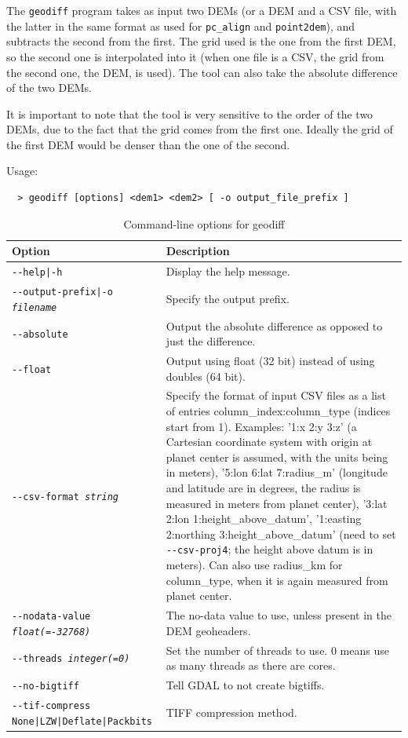 The \texttt{geodiff} program takes as input two DEMs (or a DEM and a CSV file, with the latter in the same format as used for \texttt{pc\_align} and \texttt{point2dem}), and subtracts the second from the first. The grid used is the one from the first DEM, so the second one is interpolated into it (when one file is a CSV, the grid from the second one, the DEM, is used). The tool can also take the absolute difference of the two DEMs.

It is important to note that the tool is very sensitive to the order of
the two DEMs, due to the fact that the grid comes from the first
one. Ideally the grid of the first DEM would be denser than the one of
the second.

\medskip

Usage:
\begin{verbatim}
  > geodiff [options] <dem1> <dem2> [ -o output_file_prefix ]
\end{verbatim}

\begin{longtable}{|l|p{7.5cm}|}
\caption{Command-line options for geodiff}
\label{tbl:geodiff}
\endfirsthead
\endhead
\endfoot
\endlastfoot
\hline
Option & Description \\ \hline \hline
\texttt{-\/-help|-h} & Display the help message. \\ \hline
\texttt{-\/-output-prefix|-o \textit{filename}} & Specify the output prefix. \\ \hline
\texttt{-\/-absolute} & Output the absolute difference as opposed to just the difference. \\ \hline
\texttt{-\/-float} & Output using float (32 bit) instead of using doubles (64 bit). \\ \hline
\texttt{-\/-csv-format \textit{string}} & Specify the format of input
CSV files as a list of entries column\_index:column\_type (indices start
from 1). Examples: '1:x 2:y 3:z' (a Cartesian coordinate system with
origin at planet center is assumed, with the units being in meters),
'5:lon 6:lat 7:radius\_m' (longitude and latitude are in degrees, the
radius is measured in meters from planet center), '3:lat 2:lon
1:height\_above\_datum', '1:easting 2:northing 3:height\_above\_datum'
(need to set \texttt{-\/-csv-proj4}; the height above datum is in
meters). Can also use radius\_km for column\_type, when it is again
measured from planet center. \\ \hline
\texttt{-\/-nodata-value \textit{float(=-32768)}} & The no-data value to use, unless present in the DEM geoheaders. \\ \hline
\texttt{-\/-threads \textit{integer(=0)}} & Set the number of threads to use. 0 means use as many threads as there are cores.\\ \hline
\texttt{-\/-no-bigtiff} & Tell GDAL to not create bigtiffs.\\ \hline
\texttt{-\/-tif-compress None|LZW|Deflate|Packbits} & TIFF compression method.\\ \hline
\hline
\end{longtable}


